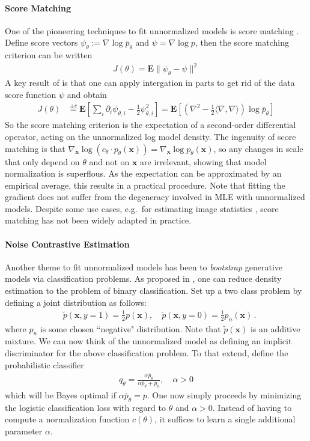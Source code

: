 \documentclass{article}
\newcommand{\E}{{\mathbf E}}
\newcommand{\x}{{\mathbf x}}
\begin{document}
\paragraph{Score Matching} One of the pioneering techniques to fit unnormalized models is score matching  \cite{hyvarinen2005estimation}. Define score vectors $\psi_\theta:= \nabla \log \bar p_\theta$ and $\psi = \nabla \log p$, then the score matching criterion can be written
\begin{align}
J(\theta) = \E  \| \psi_\theta - \psi \|^2
\end{align}
A key result of \cite[Theorem 1]{hyvarinen2005estimation} is that one can apply intergation in parts to get rid of the data score function $\psi$ and obtain
\begin{align}
J(\theta)  &\stackrel{\pm c}= 
\E  \left[ \sum_i  \partial_i \psi_{\theta,i} - \tfrac 12 \psi^2_{\theta,i} \right]
 = \mathbf E \left[ \left( \nabla^2 - \tfrac 12 \langle \nabla, \nabla \rangle \right) \log \bar p_\theta\right] 
\end{align}
So the score matching criterion is the expectation of a second-order differential operator, acting on the unnormalized log model density. The ingenuity of score matching is that  $\nabla_\x \log (c_\theta \cdot p_\theta(\x)) = \nabla_\x \log p_\theta(\x)$, so any changes in scale that only depend on $\theta$ and not on $\x$ are irrelevant, showing that model normalization is superflous.  As the expectation can be approximated by an empirical average, this results in a practical procedure. Note that fitting the gradient does not suffer from the degeneracy involved in MLE with unnormalized models. Despite some use cases, e.g.~for estimating image statistics \cite{kingma2010regularized}, score matching has not been widely adapted in practice. 

\paragraph{Noise Contrastive Estimation} Another theme to fit unnormalized models has been to \textit{bootstrap} generative models via classification problems. As proposed in  \cite{gutmann2012noise}, one can reduce density estimation to the problem of binary classification. Set up a two class problem by defining a joint distribution as follows: 
\begin{align}
& \tilde p(\x, y=1) = \tfrac12 p(\x), \quad \tilde p(\x,y=0) = \tfrac12 p_n(\x) \,.
\end{align}
where $p_n$ is some chosen ``negative" distribution. Note that $\tilde p(\x)$ is an additive mixture. We can now think of the unnormalized model as defining an implicit discriminator for the above classification problem. To that extend, define the probabilistic classifier
\begin{align}
q_\theta = \frac{\alpha \bar p_\theta}{\alpha \bar p_\theta + p_n}, \quad \alpha >0
\end{align}
which will be Bayes optimal if $\alpha \bar p_\theta = p$. One now simply proceeds by minimizing the logistic classification loss with regard to $\theta$ and $\alpha>0$. Instead of having to compute a normalization function $c(\theta)$, it suffices to learn a single additional parameter $\alpha$.  
\end{document}
